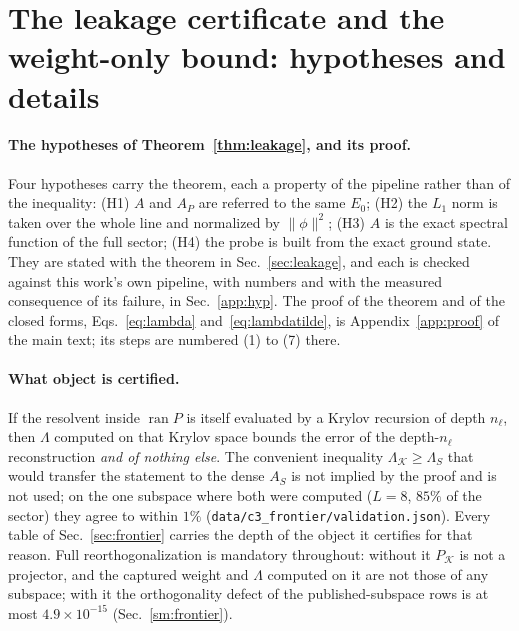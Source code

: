\section{The leakage certificate and the weight-only bound: hypotheses and details}
\label{sm:leakage}

\paragraph{The hypotheses of Theorem~\ref{thm:leakage}, and its proof.} Four hypotheses carry the
theorem, each a property of the pipeline rather than of the inequality: (H1) $A$ and $A_P$ are referred
to the same $E_0$; (H2) the $L_1$ norm is taken over the whole line and normalized by
$\lVert\phi\rVert^{2}$; (H3) $A$ is the exact spectral function of the full sector; (H4) the probe is
built from the exact ground state. They are stated with the theorem in Sec.~\ref{sec:leakage}, and each
is checked against this work's own pipeline, with numbers and with the measured consequence of its
failure, in Sec.~\ref{app:hyp}. The proof of the theorem and of the closed forms, Eqs.~\eqref{eq:lambda}
and~\eqref{eq:lambdatilde}, is Appendix~\ref{app:proof} of the main text; its steps are numbered (1) to (7) there.

\paragraph{What object is certified.} If the resolvent inside $\operatorname{ran}P$ is itself evaluated
by a Krylov recursion of depth $n_\ell$, then $\Lambda$ computed on that Krylov space bounds the error
of the depth-$n_\ell$ reconstruction \emph{and of nothing else}. %
%
%
%
%
%
The convenient inequality
$\Lambda_{\mathcal K}\ge\Lambda_S$ that would transfer the statement to the dense $A_S$ is not implied
by the proof and is not used; on the one subspace where both were computed ($L=8$, $85\%$ of the
sector) they agree to within $1\%$ (\texttt{data/c3\_frontier/validation.json}). Every table of
Sec.~\ref{sec:frontier} carries the depth of the object it certifies for that reason. Full
reorthogonalization is mandatory throughout: without it $P_{\mathcal K}$ is not a projector, and the
captured weight and $\Lambda$ computed on it are not those of any subspace; with it the orthogonality
defect of the published-subspace rows is at most $4.9\times10^{-15}$ (Sec.~\ref{sm:frontier}).

